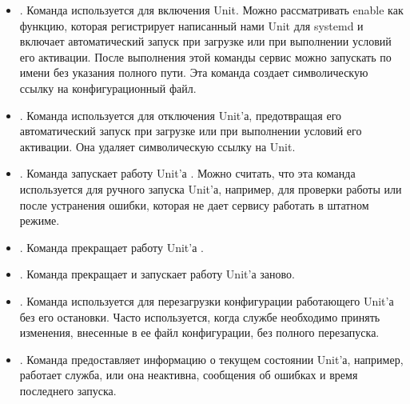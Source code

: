 \documentclass[letterpaper,10pt,russian]{sphinxmanual}
\begin{document}
\begin{itemize}
\item {} 
\sphinxAtStartPar
{}. Команда  используется для включения Unit. Можно рассматривать enable как функцию, которая регистрирует написанный нами Unit для systemd и включает автоматический запуск при загрузке или при выполнении условий его активации. После выполнения этой команды сервис можно запускать по имени без указания полного пути. Эта команда создает символическую ссылку на конфигурационный файл.

\item {} 
\sphinxAtStartPar
{}. Команда  используется для отключения Unit’а, предотвращая его автоматический запуск при загрузке или при выполнении условий его активации. Она удаляет символическую ссылку на Unit.

\item {} 
\sphinxAtStartPar
\textasciigrave{}\textasciigrave{}. Команда  запускает работу Unit’а . Можно считать, что эта команда используется для ручного запуска Unit’а, например, для проверки работы или после устранения ошибки, которая не дает сервису работать в штатном режиме.

\item {} 
\sphinxAtStartPar
{}. Команда  прекращает работу Unit’а .

\item {} 
\sphinxAtStartPar
{}. Команда  прекращает и запускает работу Unit’а  заново.

\item {} 
\sphinxAtStartPar
{}. Команда  используется для перезагрузки конфигурации работающего Unit’а без его остановки. Часто используется, когда службе необходимо принять изменения, внесенные в ее файл конфигурации, без полного перезапуска.

\item {} 
\sphinxAtStartPar
{}. Команда  предоставляет информацию о текущем состоянии Unit’а, например, работает служба, или она неактивна, сообщения об ошибках и время последнего запуска.

\end{itemize}
\end{document}
